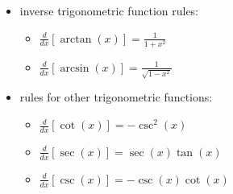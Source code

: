 \documentclass[letter, 12pt]{article}
\newcommand{\diff}[1]{\frac{d}{d#1}}
\begin{document}
{\begin{multicols}{2}
        \begin{itemize}[label=\(\centerdot\)]
            \item inverse trigonometric function rules: 
            \begin{itemize}[label=\textopenbullet, series=whale]
                \item $\displaystyle \diff{x}[\arctan(x)] = \frac{1}{1+x^2}$
                \item $\displaystyle \diff{x}[\arcsin(x)] = \frac{1}{\sqrt{1-x^2}}$
            \end{itemize}
            \vfill\null
            \item rules for other trigonometric functions:
            \begin{itemize}[resume*=whale]
                \item $\diff{x}[\cot(x)]=-\csc^2(x)$
                \item $\diff{x}[\sec(x)]=\sec(x)\tan(x)$
                \item $\diff{x}[\csc(x)]=-\csc(x)\cot(x)$
            \end{itemize}
        \end{itemize}
    \end{multicols}
}
\end{document}
